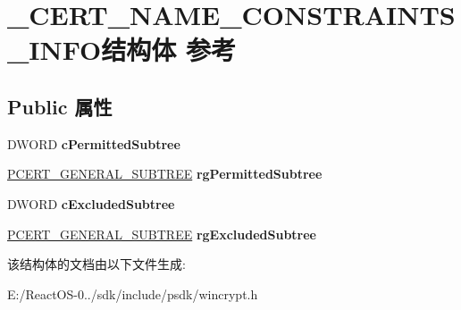 \hypertarget{struct___c_e_r_t___n_a_m_e___c_o_n_s_t_r_a_i_n_t_s___i_n_f_o}{}\section{\+\_\+\+C\+E\+R\+T\+\_\+\+N\+A\+M\+E\+\_\+\+C\+O\+N\+S\+T\+R\+A\+I\+N\+T\+S\+\_\+\+I\+N\+F\+O结构体 参考}
\label{struct___c_e_r_t___n_a_m_e___c_o_n_s_t_r_a_i_n_t_s___i_n_f_o}
\subsection*{Public 属性}
\begin{DoxyCompactItemize}
\item 
\mbox{\label{struct___c_e_r_t___n_a_m_e___c_o_n_s_t_r_a_i_n_t_s___i_n_f_o_abea1de11442dfd1c73cd621fe319f772}} 
D\+W\+O\+RD {\bfseries c\+Permitted\+Subtree}
\item 
\mbox{\label{struct___c_e_r_t___n_a_m_e___c_o_n_s_t_r_a_i_n_t_s___i_n_f_o_a3ae04209f7a4fd2268db2089704eb015}} 
\hyperlink{struct___c_e_r_t___g_e_n_e_r_a_l___s_u_b_t_r_e_e}{P\+C\+E\+R\+T\+\_\+\+G\+E\+N\+E\+R\+A\+L\+\_\+\+S\+U\+B\+T\+R\+EE} {\bfseries rg\+Permitted\+Subtree}
\item 
\mbox{\label{struct___c_e_r_t___n_a_m_e___c_o_n_s_t_r_a_i_n_t_s___i_n_f_o_a315b20f1af7b03cac23a3544d80ce8c5}} 
D\+W\+O\+RD {\bfseries c\+Excluded\+Subtree}
\item 
\mbox{\label{struct___c_e_r_t___n_a_m_e___c_o_n_s_t_r_a_i_n_t_s___i_n_f_o_aa7964cb6992b6d4d84af2519302a23e8}} 
\hyperlink{struct___c_e_r_t___g_e_n_e_r_a_l___s_u_b_t_r_e_e}{P\+C\+E\+R\+T\+\_\+\+G\+E\+N\+E\+R\+A\+L\+\_\+\+S\+U\+B\+T\+R\+EE} {\bfseries rg\+Excluded\+Subtree}
\end{DoxyCompactItemize}


该结构体的文档由以下文件生成\+:\begin{DoxyCompactItemize}
\item 
E\+:/\+React\+O\+S-\/0../sdk/include/psdk/wincrypt.\+h\end{DoxyCompactItemize}
